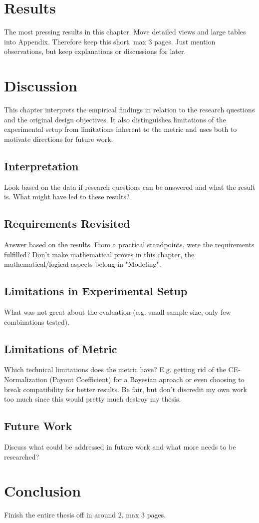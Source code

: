 \chapter{Results}
The most pressing results in this chapter. Move detailed views and large tables into Appendix. Therefore keep this short, max 3 pages. Just mention observations, but keep explanations or discussions for later.

\chapter{Discussion}
This chapter interprets the empirical findings in relation to the research questions and the original design objectives. It also distinguishes limitations of the experimental setup from limitations inherent to the metric and uses both to motivate directions for future work.

\section{Interpretation}
Look based on the data if research questions can be answered and what the result is. What might have led to these results?

\section{Requirements Revisited}
Answer based on the results. From a practical standpoints, were the requirements fulfilled? Don't make mathematical proves in this chapter, the mathematical/logical aspects belong in "Modeling".

\section{Limitations in Experimental Setup}
What was not great about the evaluation (e.g. small sample size, only few combinations tested).

\section{Limitations of Metric}
Which technical limitations does the metric have? E.g. getting rid of the CE-Normalization (Payout Coefficient) for a Bayesian aproach or even choosing to break compatibility for better results. Be fair, but don't discredit my own work too much since this would pretty much destroy my thesis.

\section{Future Work}
Discuss what could be addressed in future work and what more needs to be researched?

\chapter{Conclusion}
Finish the entire thesis off in around 2, max 3 pages.

